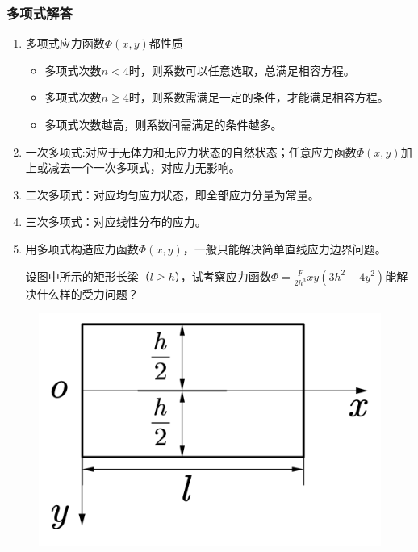 \subsubsection{多项式解答}
\begin{enumerate}
	\item 多项式应力函数$\varPhi \left( x,y \right) $都性质
	\begin{itemize}
		\item 多项式次数$n<4$时，则系数可以任意选取，总满足相容方程。
		\item 多项式次数$n\geqslant 4$时，则系数需满足一定的条件，才能满足相容方程。
		\item 多项式次数越高，则系数间需满足的条件越多。
	\end{itemize}
	\item 一次多项式:对应于无体力和无应力状态的自然状态；任意应力函数$\varPhi \left( x,y \right) $加上或减去一个一次多项式，对应力无影响。
	\item 二次多项式：对应均匀应力状态，即全部应力分量为常量。
	\item 三次多项式：对应线性分布的应力。
	\item 用多项式构造应力函数$\varPhi \left( x,y \right) $，一般只能解决简单直线应力边界问题。
\newpage
\begin{example}
	设图中所示的矩形长梁（$l\geqslant h$），试考察应力函数$\varPhi =\frac{F}{2h^3}xy\left( 3h^2-4y^2 \right) $能解决什么样的受力问题？
\end{example}
\end{enumerate}
\begin{figure}[!h]
\centering
\includegraphics[scale=0.4]{figure/3-1.png}
\end{figure}
